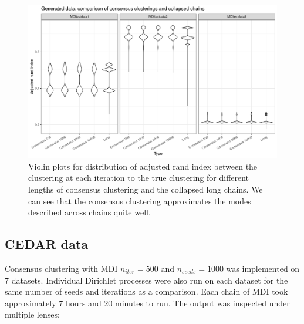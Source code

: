 \documentclass[12pt]{article} %
\begin{document}
	\newpage

	\begin{figure}[h]
		\centering
		\includegraphics[scale=0.65]{Images/Gen_data/Case_2/violin_plot_ari_true_clustering_collapsed_long.png}
		\caption{Violin plots for distribution of adjusted rand index between the clustering at each iteration to the true clustering for different lengths of consensus clustering and the collapsed long chains. We can see that the consensus clustering approximates the modes described across chains quite well.}
		\label{fig:gen_data_case_2_collapsed_violin_plot}
	\end{figure}

	\newpage

	\subsection{CEDAR data}
	Consensus clustering with MDI $n_{iter}=500$ and $n_{seeds}=1000$ was implemented on 7 datasets. Individual Dirichlet processes were also run on each dataset for the same number of seeds and iterations as a comparison. Each chain of MDI took approximately 7 hours and 20 minutes to run. The output was inspected under multiple lenses: 
	
\end{document}
